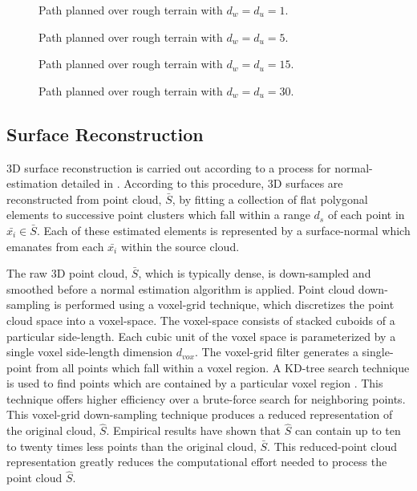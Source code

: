 				\begin{figure}
					\centering
					\caption{Path planned over rough terrain with $d_{w}=d_{u}=1$.}
					\label{fig::terrain_path_1}
				\end{figure}
				\begin{figure}
					\centering
					\caption{Path planned over rough terrain with $d_{w}=d_{u}=5$.}
					\label{fig::terrain_path_2}
				\end{figure}
				\begin{figure}
					\centering
					\caption{Path planned over rough terrain with $d_{w}=d_{u}=15$.}
					\label{fig::terrain_path_3}
				\end{figure}
				\begin{figure}
					\centering
					\caption{Path planned over rough terrain with $d_{w}=d_{u}=30$.}
					\label{fig::terrain_path_4}
				\end{figure}



		\subsection{Surface Reconstruction}

			3D surface reconstruction is carried out according to a process for normal-estimation detailed in \cite{Rusu2009}. According to this procedure, 3D surfaces are reconstructed from point cloud, $\bar{S}$, by fitting a collection of flat polygonal elements to successive point clusters which fall within a range $d_{s}$ of each point in $\bar{x_{i}}\in\bar{S}$. Each of these estimated elements is represented by a surface-normal which emanates from each $\bar{x_{i}}$ within the source cloud.

			The raw 3D point cloud, $\bar{S}$, which is typically dense, is down-sampled and smoothed before a normal estimation algorithm is applied. Point cloud down-sampling is performed using a voxel-grid technique, which discretizes the point cloud space into a voxel-space. The voxel-space consists of stacked cuboids of a particular side-length. Each cubic unit of the voxel space is parameterized by a single voxel side-length dimension $d_{vox}$. The voxel-grid filter generates a single-point from all points which fall within a voxel region. A KD-tree search technique is used to find points which are contained by a particular voxel region \cite{Rusu2009}. This technique offers higher efficiency over a brute-force search for neighboring points. This voxel-grid down-sampling technique produces a reduced representation of the original cloud, $\hat{S}$. Empirical results have shown that $\hat{S}$ can contain up to ten to twenty times less points than the original cloud, $\bar{S}$. This reduced-point cloud representation greatly reduces the computational effort needed to process the point cloud $\hat{S}$.

